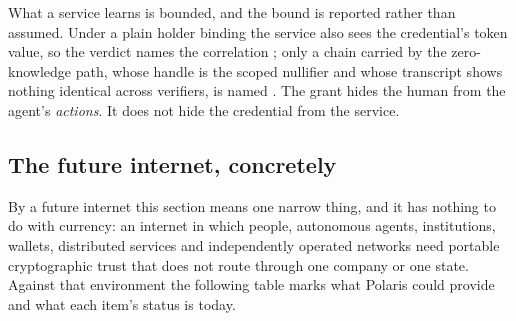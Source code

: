 What a service learns is bounded, and the bound is reported rather than assumed. Under a plain holder
binding the service also sees the credential's token value, so the verdict names the correlation
; only a chain carried by the zero-knowledge path, whose handle is the scoped
nullifier and whose transcript shows nothing identical across verifiers, is named .
The grant hides the human from the agent's \emph{actions}. It does not hide the credential from the
service.

\subsection{The future internet, concretely}

By a future internet this section means one narrow thing, and it has nothing to do with currency:
an internet in which people, autonomous agents, institutions, wallets, distributed services and independently
operated networks need portable cryptographic trust that does not route through one company or one
state. Against that environment the following table marks what Polaris could provide and what each
item's status is today.

